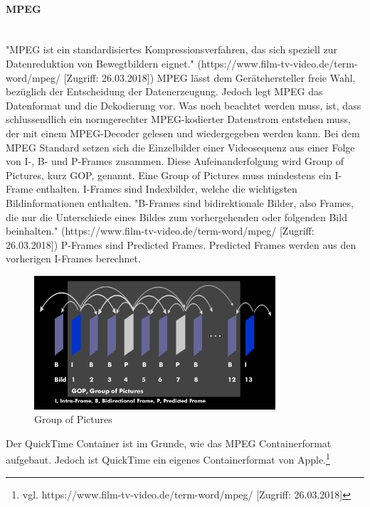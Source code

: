 \paragraph{MPEG}
\leavevmode \\
"MPEG ist ein standardisiertes Kompressionsverfahren, das sich speziell zur Datenreduktion von Bewegtbildern eignet." (https://www.film-tv-video.de/term-word/mpeg/ [Zugriff: 26.03.2018]) MPEG lässt dem Gerätehersteller freie Wahl, bezüglich der Entscheidung der Datenerzeugung. Jedoch legt MPEG das Datenformat und die Dekodierung vor. Was noch beachtet werden muss, ist, dass schlussendlich ein normgerechter MPEG-kodierter Datenstrom entstehen muss, der mit einem MPEG-Decoder gelesen und wiedergegeben werden kann. Bei dem MPEG Standard setzen sich die Einzelbilder einer Videosequenz aus einer Folge von I-, B- und P-Frames zusammen. Diese Aufeinanderfolgung wird Group of Pictures, kurz GOP, genannt. Eine Group of Pictures muss mindestens ein I-Frame enthalten. I-Frames sind Indexbilder, welche die wichtigsten Bildinformationen enthalten. "B-Frames sind  bidirektionale Bilder, also Frames, die nur die Unterschiede eines Bildes zum vorhergehenden oder folgenden Bild beinhalten." (https://www.film-tv-video.de/term-word/mpeg/ [Zugriff: 26.03.2018]) P-Frames sind Predicted Frames. Predicted Frames werden aus den vorherigen I-Frames berechnet.\newline
\begin{figure}[H]
	\centering
	\includegraphics[width=0.8\textwidth]{abb27} 
	\caption{Group of Pictures}
\end{figure}
Der QuickTime Container ist im Grunde, wie das MPEG Containerformat aufgebaut. Jedoch ist QuickTime ein eigenes Containerformat von Apple.\footnote{vgl. https://www.film-tv-video.de/term-word/mpeg/ [Zugriff: 26.03.2018]}
